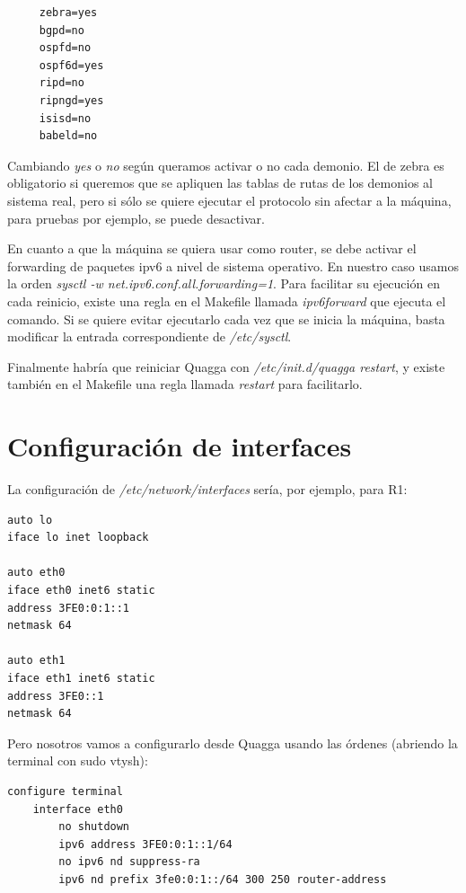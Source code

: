 \documentclass{article}
\begin{document}
 \begin{verbatim}
	 zebra=yes
	 bgpd=no
	 ospfd=no
	 ospf6d=yes
	 ripd=no
	 ripngd=yes
	 isisd=no
	 babeld=no
 \end{verbatim}

 Cambiando \textit{yes} o \textit{no} según queramos activar o no cada demonio. El de zebra es obligatorio si queremos que se apliquen las tablas de rutas de los demonios al sistema real, pero si sólo se quiere ejecutar el protocolo sin afectar a la máquina, para pruebas por ejemplo, se puede desactivar.

 En cuanto a que la máquina se quiera usar como router, se debe activar el forwarding de paquetes ipv6 a nivel de sistema operativo. En nuestro caso usamos la orden \textit{sysctl -w net.ipv6.conf.all.forwarding=1}. Para facilitar su ejecución en cada reinicio, existe una regla en el Makefile llamada \textit{ipv6forward} que ejecuta el comando. Si se quiere evitar ejecutarlo cada vez que se inicia la máquina, basta modificar la entrada correspondiente de \textit{/etc/sysctl}.


 Finalmente habría que reiniciar Quagga con \textit{/etc/init.d/quagga restart}, y existe también en el Makefile una regla llamada \textit{restart} para facilitarlo.
 
\section{Configuración de interfaces}

La configuración de \textit{/etc/network/interfaces} sería, por ejemplo, para R1:

\begin{BVerbatim}
auto lo
iface lo inet loopback

auto eth0
iface eth0 inet6 static
address 3FE0:0:1::1
netmask 64

auto eth1
iface eth1 inet6 static
address 3FE0::1
netmask 64
\end{BVerbatim}

\hfill


Pero nosotros vamos a configurarlo desde Quagga usando las órdenes (abriendo la terminal con sudo vtysh):

\hfil

\begin{BVerbatim}
configure terminal
	interface eth0
		no shutdown
		ipv6 address 3FE0:0:1::1/64
		no ipv6 nd suppress-ra
		ipv6 nd prefix 3fe0:0:1::/64 300 250 router-address
\end{BVerbatim}
\end{document}
